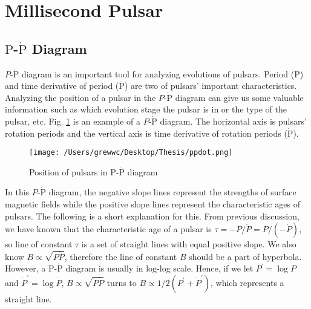 \documentclass[12pt]{report}
\begin{document}
      \section{Millisecond Pulsar} 
        \subsection{$\mbox{P}$-$\dot{\mbox{P}}$ Diagram} 
          $P$-$\dot{\mbox{P}}$ diagram is an important tool for analyzing evolutions of 
          pulsars. Period ($\mbox{P}$) and time derivative of period ($\dot{\mbox{P}}$) are 
          two of pulsars' important characteristics. Analyzing the position of a pulsar in 
          the $P$-$\dot{\mbox{P}}$ diagram can give us some valuable information such as 
          which evolution stage the pulsar is in or the type of the pulsar, etc. 
          Fig. \ref{fig:p-pdot} is an example of a $P$-$\dot{\mbox{P}}$ diagram. 
          The horizontal axis is pulsars' rotation periods and the vertical axis is time 
          derivative of rotation periods ($\dot{\mbox{P}}$).
          \begin{figure}[h]
              \centering
              \texttt{[image: /Users/grewwc/Desktop/Thesis/ppdot.png]}
              \caption{\protect Position of pulsars in $\mbox{P}$-$\dot{\mbox{P}}$ diagram}
              \label{fig:p-pdot}
          \end{figure}
          In this $P$-$\dot{\mbox{P}}$ diagram, the negative slope lines represent the strengths 
          of surface magnetic fields while the positive slope lines represent the characteristic 
          ages of pulsars. The following is a short explanation for this. 
          From previous discussion, we have known that the 
          characteristic age of a pulsar is $\tau=-P/\dot{P}=P/(-\dot{P})$, so line of constant 
          $\tau$ is a set of straight lines with equal positive slope. We also know 
          $B\propto\sqrt{P\dot{P}}$, therefore the line of constant $B$ should be a part 
          of hyperbola. However, a $\mbox{P}$-$\dot{\mbox{P}}$ diagram is usually in log-log 
          scale. Hence, if we let $P^{\prime}=\log{P}$ and $\dot{P}^{\prime}=\log{\dot{P}}$,
          $B\propto\sqrt{P\dot{P}}$ turns to 
          $B\propto 1/2 \left(P^{\prime} + \dot{P}^{\prime}\right)$, 
          which represents a straight line.
\end{document}
